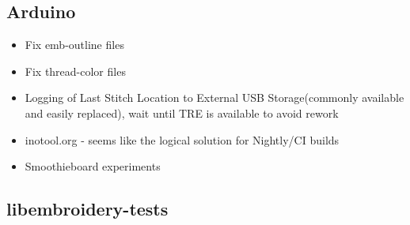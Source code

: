 \documentclass[11pt]{report}
\begin{document}
\subsection{Arduino}

\begin{itemize}
\item Fix emb-outline files
\item Fix thread-color files
\item Logging of Last Stitch Location to External USB Storage(commonly available and easily replaced), wait until TRE is available to avoid rework
\item inotool.org - seems like the logical solution for Nightly/CI builds
\item Smoothieboard experiments
\end{itemize}

\subsection{libembroidery-tests}
\end{document}
